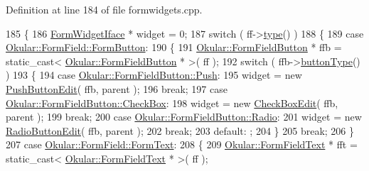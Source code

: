 Definition at line 184 of file formwidgets.\+cpp.


\begin{DoxyCode}
185 \{
186     \hyperlink{classFormWidgetIface}{FormWidgetIface} * widget = 0;
187     \textcolor{keywordflow}{switch} ( ff->\hyperlink{classOkular_1_1FormField_a35d03786e3e37e783c43f1206c5a7842}{type}() )
188     \{
189         \textcolor{keywordflow}{case} \hyperlink{classOkular_1_1FormField_a46e9c2bd0942dfe55408c8c1aa5363cfa8c2253f3712ab5b8f221ac945be8a3a2}{Okular::FormField::FormButton}:
190         \{
191             \hyperlink{classOkular_1_1FormFieldButton}{Okular::FormFieldButton} * ffb = \textcolor{keyword}{static\_cast<} 
      \hyperlink{classOkular_1_1FormFieldButton}{Okular::FormFieldButton} * \textcolor{keyword}{>}( ff );
192             \textcolor{keywordflow}{switch} ( ffb->\hyperlink{classOkular_1_1FormFieldButton_ad788d8b6383fa96173a4876292d1f18e}{buttonType}() )
193             \{
194                 \textcolor{keywordflow}{case} \hyperlink{classOkular_1_1FormFieldButton_a4b03fd77132be17273c8f4ebbd247186a695472284a9cac26351b37a9a9b5b839}{Okular::FormFieldButton::Push}:
195                     widget = \textcolor{keyword}{new} \hyperlink{classPushButtonEdit}{PushButtonEdit}( ffb, parent );
196                     \textcolor{keywordflow}{break};
197                 \textcolor{keywordflow}{case} \hyperlink{classOkular_1_1FormFieldButton_a4b03fd77132be17273c8f4ebbd247186aa5cf5e1b5256d0772bdd6e87e4989b95}{Okular::FormFieldButton::CheckBox}:
198                     widget = \textcolor{keyword}{new} \hyperlink{classCheckBoxEdit}{CheckBoxEdit}( ffb, parent );
199                     \textcolor{keywordflow}{break};
200                 \textcolor{keywordflow}{case} \hyperlink{classOkular_1_1FormFieldButton_a4b03fd77132be17273c8f4ebbd247186aecc91a17eb86524d6f40713cd0407d4e}{Okular::FormFieldButton::Radio}:
201                     widget = \textcolor{keyword}{new} \hyperlink{classRadioButtonEdit}{RadioButtonEdit}( ffb, parent );
202                     \textcolor{keywordflow}{break};
203                 \textcolor{keywordflow}{default}: ;
204             \}
205             \textcolor{keywordflow}{break};
206         \}
207         \textcolor{keywordflow}{case} \hyperlink{classOkular_1_1FormField_a46e9c2bd0942dfe55408c8c1aa5363cfa46c90a3f76b54ce41f6b07b78a3bd394}{Okular::FormField::FormText}:
208         \{
209             \hyperlink{classOkular_1_1FormFieldText}{Okular::FormFieldText} * fft = \textcolor{keyword}{static\_cast<} 
      \hyperlink{classOkular_1_1FormFieldText}{Okular::FormFieldText} * \textcolor{keyword}{>}( ff );

\end{DoxyCode}
